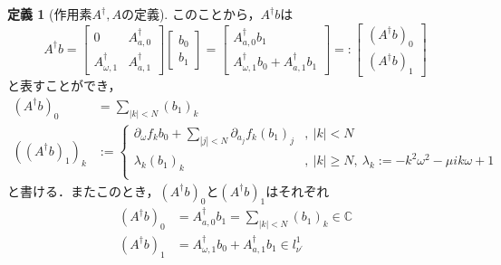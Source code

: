 \documentclass[11pt,a4paper,titlepage]{jsreport}
\theoremstyle{definition}
\newtheorem{dfn}{定義}
\begin{document}
\begin{dfn}[作用素$A^\dagger,A$の定義]
  このことから，$A^\dagger b$は
  \begin{equation*}
    A^\dagger b = \begin{bmatrix}
      0                    & A^\dagger_{a,0} \\
      A^\dagger_{\omega,1} & A^\dagger_{a,1}
    \end{bmatrix}
    \begin{bmatrix}
      b_0 \\
      b_1
    \end{bmatrix}
    = \begin{bmatrix}
      A_{a,0}^\dagger b_1 \\
      A_{\omega,1}^\dagger b_0 + A_{a,1}^\dagger b_1
    \end{bmatrix}
    =: \begin{bmatrix}
      \left(A^\dagger b\right)_0 \\
      \left(A^\dagger b\right)_1
    \end{bmatrix}
  \end{equation*}
  と表すことができ，
  \begin{align*}
    \left(A^\dagger b\right)_0                & = \sum_{|k|<N} (b_1)_k                                                                                                             \\
    \left(\left(A^\dagger b\right)_1\right)_k & := \begin{cases}
                                                     \partial_\omega f_k b_0 + \sum_{|j|<N} \partial_{a_j} f_k (b_1)_j & ,\ |k|<N                                                    \\
                                                     \lambda_k (b_1)_k                                                 & ,\ |k|\geq N,\ \lambda_k := -k^2\omega^2 - \mu ik\omega + 1 \\
                                                   \end{cases}
  \end{align*}
  と書ける．またこのとき，$(A^\dagger b)_0$と$(A^\dagger b)_1$はそれぞれ
  \begin{align*}
    \left(A^\dagger b\right)_0 & = A_{a,0}^\dagger b_1 = \sum_{|k|<N} (b_1)_k \in \mathbb{C} \\
    \left(A^\dagger b\right)_1 & = A_{\omega,1}^\dagger b_0 + A_{a,1}^\dagger b_1 \in l_{\nu^\prime}^1
  \end{align*}


\end{dfn}
\end{document}
